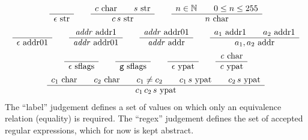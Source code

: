 \documentclass[11pt]{article}
\newcommand\RULE[2]{\begin{array}{c} #1 \\ \hline #2 \end{array}}
\newcommand\J[1]{\ensuremath{\text{ #1}}}
\begin{document}
\begin{gather*}
	\RULE{}{\epsilon \J{str}} \qquad
	\RULE{c \J{char} \qquad s \J{str}}{c\,s \J{str}} \qquad
	\RULE{n \in \mathbb{N} \qquad 0 \leq n \leq 255}{n \J{char}} \\
	\RULE{}{\epsilon \J{addr01}} \qquad
	\RULE{\arg{addr} \J{addr1}}{\arg{addr} \J{addr01}} \qquad
	\RULE{\arg{addr} \J{addr01}}{\arg{addr} \J{addr}} \qquad
	\RULE{a_1 \J{addr1} \qquad a_2 \J{addr1}}{a_1,a_2 \J{addr}} \\
	\RULE{}{\epsilon \J{sflags}} \qquad
	\RULE{}{\cmd{g} \J{sflags}} \qquad
	\RULE{}{\epsilon \J{ypat}} \qquad
	\RULE{\arg{c} \J{char}}{\arg{c} \J{ypat}} \\
	\RULE{c_1 \J{char} \qquad c_2 \J{char} \qquad c_1 \not= c_2 \qquad c_1\,s \J{ypat} \qquad c_2\,s \J{ypat}}{c_1\,c_2\,s \J{ypat}}
\end{gather*}
The ``label'' judgement defines a set of values on which only an equivalence relation (equality) is required.
The ``regex'' judgement defines the set of accepted regular expressions, which for now is kept abstract.
\end{document}
